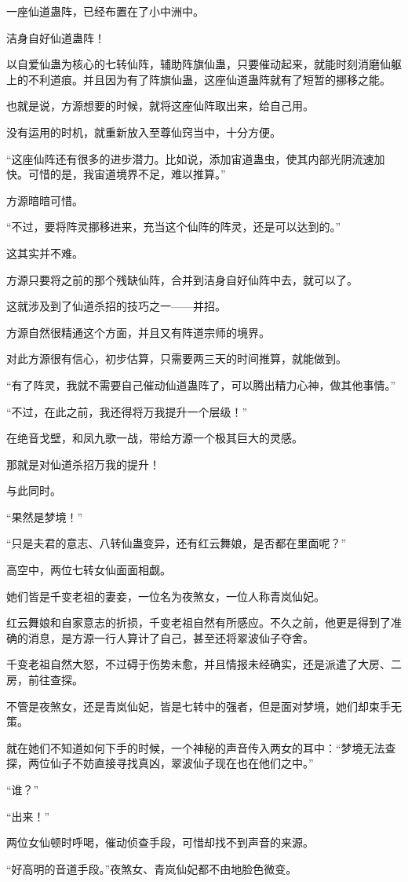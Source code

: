 \begin{this_body}
一座仙道蛊阵，已经布置在了小中洲中。

洁身自好仙道蛊阵！

以自爱仙蛊为核心的七转仙阵，辅助阵旗仙蛊，只要催动起来，就能时刻消磨仙躯上的不利道痕。并且因为有了阵旗仙蛊，这座仙道蛊阵就有了短暂的挪移之能。

也就是说，方源想要的时候，就将这座仙阵取出来，给自己用。

没有运用的时机，就重新放入至尊仙窍当中，十分方便。

“这座仙阵还有很多的进步潜力。比如说，添加宙道蛊虫，使其内部光阴流速加快。可惜的是，我宙道境界不足，难以推算。”

方源暗暗可惜。

“不过，要将阵灵挪移进来，充当这个仙阵的阵灵，还是可以达到的。”

这其实并不难。

方源只要将之前的那个残缺仙阵，合并到洁身自好仙阵中去，就可以了。

这就涉及到了仙道杀招的技巧之一——并招。

方源自然很精通这个方面，并且又有阵道宗师的境界。

对此方源很有信心，初步估算，只需要两三天的时间推算，就能做到。

“有了阵灵，我就不需要自己催动仙道蛊阵了，可以腾出精力心神，做其他事情。”

“不过，在此之前，我还得将万我提升一个层级！”

在绝音戈壁，和凤九歌一战，带给方源一个极其巨大的灵感。

那就是对仙道杀招万我的提升！

与此同时。

“果然是梦境！”

“只是夫君的意志、八转仙蛊变异，还有红云舞娘，是否都在里面呢？”

高空中，两位七转女仙面面相觑。

她们皆是千变老祖的妻妾，一位名为夜煞女，一位人称青岚仙妃。

红云舞娘和自家意志的折损，千变老祖自然有所感应。不久之前，他更是得到了准确的消息，是方源一行人算计了自己，甚至还将翠波仙子夺舍。

千变老祖自然大怒，不过碍于伤势未愈，并且情报未经确实，还是派遣了大房、二房，前往查探。

不管是夜煞女，还是青岚仙妃，皆是七转中的强者，但是面对梦境，她们却束手无策。

就在她们不知道如何下手的时候，一个神秘的声音传入两女的耳中：“梦境无法查探，两位仙子不妨直接寻找真凶，翠波仙子现在也在他们之中。”

“谁？”

“出来！”

两位女仙顿时呼喝，催动侦查手段，可惜却找不到声音的来源。

“好高明的音道手段。”夜煞女、青岚仙妃都不由地脸色微变。

\end{this_body}

